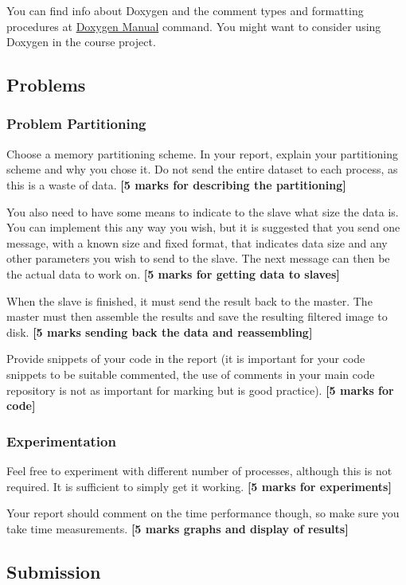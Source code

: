You can find info about Doxygen and the comment types and formatting procedures at \href{https://www.doxygen.nl/index.html}{Doxygen Manual} command. You might want to consider using Doxygen in the course project.

\subsection{Problems}
\subsubsection{Problem Partitioning}
Choose a memory partitioning scheme. In your report, explain your partitioning scheme and why you chose it. Do not send the entire dataset to each process, as this is a waste of data. \textbf{[5 marks for describing the partitioning]}

You also need to have some means to indicate to the slave what size the data is. You can implement this any way you wish, but it is suggested that you send one message, with a known size and fixed format, that indicates data size and any other parameters you wish to send to the slave. The next message can then be the actual data to work on. \textbf{[5 marks for getting data to slaves]}

When the slave is finished, it must send the result back to the master. The master must then assemble the results and save the resulting filtered image to disk. \textbf{[5 marks sending back the data and reassembling]}

Provide snippets of your code in the report (it is important for your code snippets to be suitable commented, the use of comments in your main code repository is not as important for marking but is good practice). \textbf{[5 marks for code]}

\subsubsection{Experimentation}
Feel free to experiment with different number of processes, although this is not required. It is sufficient to simply get it working. \textbf{[5 marks for experiments]}

Your report should comment on the time performance though, so make sure you take time measurements. \textbf{[5 marks graphs and display of results]}

\subsection{Submission}

